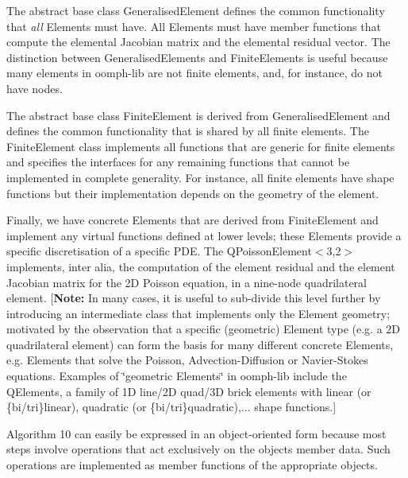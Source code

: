 \begin{DoxyItemize}
\item The abstract base class {\ttfamily Generalised\+Element} defines the common functionality that {\itshape all} Elements must have. All Elements must have member functions that compute the elemental Jacobian matrix and the elemental residual vector. The distinction between {\ttfamily Generalised\+Elements} and {\ttfamily Finite\+Elements} is useful because many elements in {\ttfamily oomph-\/lib} are not finite elements, and, for instance, do not have nodes.
\item The abstract base class {\ttfamily Finite\+Element} is derived from {\ttfamily Generalised\+Element} and defines the common functionality that is shared by all finite elements. The {\ttfamily Finite\+Element} class implements all functions that are generic for finite elements and specifies the interfaces for any remaining functions that cannot be implemented in complete generality. For instance, all finite elements have shape functions but their implementation depends on the geometry of the element.
\item Finally, we have concrete Elements that are derived from {\ttfamily Finite\+Element} and implement any virtual functions defined at lower levels; these Elements provide a specific discretisation of a specific P\+DE. The {\ttfamily Q\+Poisson\+Element$<$3,2$>$} implements, inter alia, the computation of the element residual and the element Jacobian matrix for the 2D Poisson equation, in a nine-\/node quadrilateral element. \mbox{[}{\bfseries Note\+:} In many cases, it is useful to sub-\/divide this level further by introducing an intermediate class that implements only the Element geometry; motivated by the observation that a specific (geometric) Element type (e.\+g. a 2D quadrilateral element) can form the basis for many different concrete Elements, e.\+g. Elements that solve the Poisson, Advection-\/\+Diffusion or Navier-\/\+Stokes equations. Examples of \char`\"{}geometric Elements\char`\"{} in {\ttfamily oomph-\/lib} include the {\ttfamily Q\+Elements}, a family of 1D line/2D quad/3D brick elements with linear (or \{bi/tri\}linear), quadratic (or \{bi/tri\}quadratic),... shape functions.\mbox{]}

Algorithm 10 can easily be expressed in an object-\/oriented form because most steps involve operations that act exclusively on the objects\textquotesingle{} member data. Such operations are implemented as member functions of the appropriate objects.


\end{DoxyItemize}
